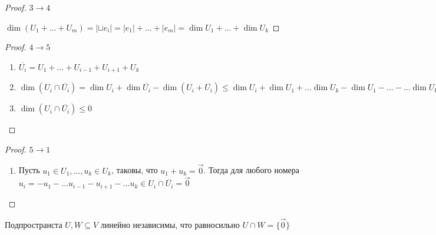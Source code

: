 \begin{theorem}
    \begin{proof} $3 \rightarrow 4$

        $\dim(U_1 + \dots + U_m) = |\sqcup e_i| = |e_1| + \dots + |e_m| = \dim U_1 + \dots + \dim U_k$
        
    \end{proof}

    \begin{proof} $4 \rightarrow 5$

        \begin{enumerate}
            \item $\overline{U_i} = U_1 + \dots + U_{i - 1} + U_{i + 1} + U_k$
            \item $\dim(U_i \cap \overline{U_i}) = \dim U_i + \dim \overline{U_i} - \dim (U_i + \overline{U_i}) \leq \dim U_i + \dim U_1 + \dots \dim U_k - \dim U_1 - \dots - \dots \dim U_k = 0$
            \item $\dim (U_i \cap \overline{U_i}) \leq 0$
        \end{enumerate}
        
    \end{proof}

    \begin{proof} $5 \rightarrow 1$

        \begin{enumerate}
            \item Пусть $u_1 \in U_1, \dots, u_k \in U_k$, таковы, что $u_1 + u_k = \vec{0}$. Тогда для любого номера $u_i = - u_1 - \dots u_{i - 1} - u_{i + 1} - \dots u_k \in U_i \cap \overline{U_i} = \vec{0}$
        \end{enumerate}
        
    \end{proof}

    \begin{corollary}
    
        Подпространста $U, W \subseteq V$ линейно независимы, что равносильно $U \cap W = \{\vec{0}\}$

    \end{corollary}

\end{theorem}


\bigskip


